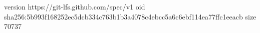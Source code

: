 version https://git-lfs.github.com/spec/v1
oid sha256:5b993f168252ec5dcb334c763b1b3a4078c4ebcc5a6c6ebf114ea77ffc1eeacb
size 70737
